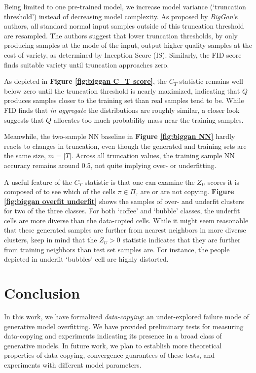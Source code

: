 Being limited to one pre-trained model, we increase model variance (`truncation threshold') instead of decreasing model complexity. As proposed by \emph{BigGan}'s authors, all standard normal input samples outside of this truncation threshold are resampled. The authors suggest that lower truncation thresholds, by only producing samples at the mode of the input, output higher quality samples at the cost of variety, as determined by Inception Score (IS). Similarly, the FID score finds suitable variety until truncation approaches zero. 

As depicted in \textbf{ Figure \ref{fig:biggan C_T score}}, the $C_T$ statistic remains well below zero until the truncation threshold is nearly maximized, indicating that $Q$ produces samples closer to the training set than real samples tend to be. While FID finds that \emph{in aggregate} the distributions are roughly similar, a closer look suggests that $Q$ allocates too much probability mass near the training samples. 

Meanwhile, the two-sample NN baseline in \textbf{ Figure \ref{fig:biggan NN} } hardly reacts to changes in truncation, even though the generated and training sets are the same size, $m = |T|$. Across all truncation values, the training sample NN accuracy remains around 0.5, not quite implying over- or underfitting.  

A useful feature of the $C_T$ statistic is that one can examine the $Z_U$ scores it is composed of to see which of the cells $\pi \in \Pi_{\tau}$ are or are not copying. \textbf{ Figure \ref{fig:biggan overfit underfit} } shows the samples of over- and underfit clusters for two of the three classes. For both `coffee' and `bubble' classes, the underfit cells are more diverse than the data-copied cells. While it might seem reasonable that these generated samples are further from nearest neighbors in more diverse clusters, keep in mind that the $Z_U > 0$ statistic indicates that they are further from training neighbors than test set samples are. For instance, the people depicted in underfit `bubbles' cell are highly distorted.  

\section{Conclusion}
In this work, we have formalized \emph{data-copying}: an under-explored failure mode of generative model overfitting. We have provided preliminary tests for measuring data-copying and experiments indicating its presence in a broad class of generative models. In future work, we plan to establish more theoretical properties of data-copying, convergence guarantees of these tests, and experiments with different model parameters. 

